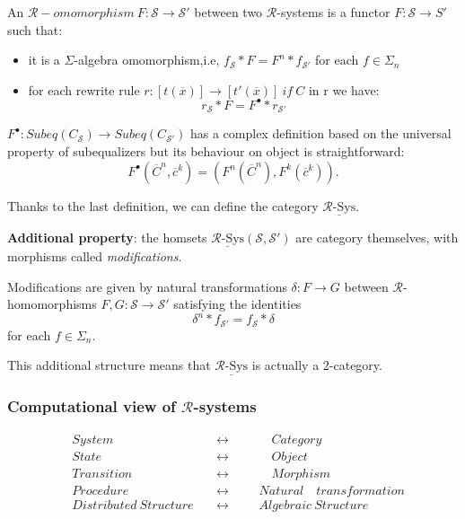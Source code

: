 \documentclass{beamer}
\begin{document}
\begin{frame}
    \scriptsize
    An $\mathcal{R}-omomorphism\ F: \mathcal{S} \rightarrow \mathcal{S}'$ between two $\mathcal{R}$-systems is a 
    functor $F:\mathcal{S} \rightarrow S'$ such that:
    \begin{itemize}
        \item it is a $\Sigma$-algebra omomorphism,i.e, $f_\mathcal{S}*F = F^n*f_{\mathcal{S}'}$ for each $f \in \Sigma_n$
        \item for each rewrite rule $r:[t(\overline{x})] \rightarrow [t'(\overline{x})]\ if\ C$ in r we have: 
        $$ r_\mathcal{S} * F = F^\bullet * r_{\mathcal{S}'} $$
    \end{itemize}
    $F^\bullet:Subeq(C_\mathcal{S}) \rightarrow Subeq(C_{\mathcal{S}'})$ has  a complex definition based on the universal property of subequalizers 
    but its behaviour on object is straightforward: 
    $$F^\bullet(\overline{C}^n,\overline{c}^k) = (F^n(\overline{C}^n),F^k(\overline{c}^k)). $$

 
    \pause 
    Thanks to the last definition, we can define the category $\underline{\mathcal{R}\text{-Sys}}$. 

    \medskip
    \pause
    \textbf{Additional property}: the homsets $\underline{\mathcal{R}\text{-Sys}}(\mathcal{S},\mathcal{S}')$ are 
    category themselves, with morphisms called \emph{modifications}.

    Modifications are given by natural transformations $\delta: F \rightarrow G$ between $\mathcal{R}$-homomorphisms 
    $F,G:\mathcal{S} \rightarrow \mathcal{S}'$ satisfying the identities
    $$\delta^n * f_{\mathcal{S}'} =  f_\mathcal{S} * \delta$$
    for each $f \in \Sigma_n$. 

    \medskip
    \pause
    This additional structure means that $\underline{\mathcal{R}\text{-Sys}}$ is actually a 2-category.
\end{frame}
\begin{frame}
    \frametitle{Computational view of $\mathcal{R}$-systems}
    \large
    \begin{align*}
        &System \quad &&\leftrightarrow  &&&\quad Category \\
        &State \quad &&\leftrightarrow &&&\quad  Object \\
        &Transition \quad &&\leftrightarrow &&&\quad Morphism \\ 
        &Procedure \quad &&\leftrightarrow &&&Natural \quad transformation \\ 
        &Distributed\ Structure\ &&\leftrightarrow &&& Algebraic\ Structure 
    \end{align*}
\end{frame}
\end{document}
